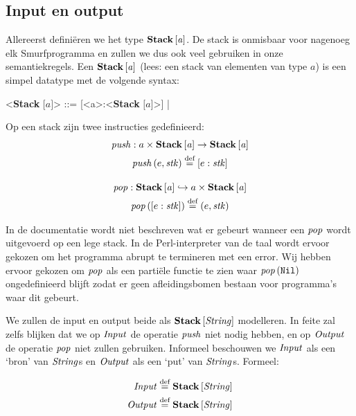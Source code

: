\subsection{Input en output}
\label{sec:def:io}

Allereerst definiëren we het type $\mathbf{Stack}\left[\mathit{a}\right]$. De stack is onmisbaar voor
nagenoeg elk Smurfprogramma en zullen we dus ook veel gebruiken in onze
semantiekregels. Een $\mathbf{Stack}\left[\mathit{a}\right]$ (lees: een stack van elementen van type $a$)
is een simpel datatype met de volgende syntax:

\def\inbrackets#1{$\mathrm{[}#1\mathrm{]}$}
\def\bracka{\inbrackets{a}}
\def\StackA{{\normalfont\textbf{Stack}} \bracka}
\begin{grammar}
	<\StackA> ::= [<a>:<\StackA>] | \Nil
\end{grammar}

Op een stack zijn twee instructies gedefinieerd:
\begin{gather*}
	\mathit{push} : a \times \mathbf{Stack}\left[\mathit{a}\right] \to \mathbf{Stack}\left[\mathit{a}\right] \\
	\mathit{push}\left(e, \mathit{stk}\right) \stackrel{\text{def}}{=} [e:\mathit{stk}] \\[1em]
	\mathit{pop} : \mathbf{Stack}\left[\mathit{a}\right] \hookrightarrow a \times \mathbf{Stack}\left[\mathit{a}\right] \\
	\mathit{pop}\left([e:\mathit{stk}]\right) \stackrel{\text{def}}{=} (e,\mathit{stk}) \\
\end{gather*}

In de documentatie \cite{safalra} wordt niet beschreven wat er gebeurt wanneer
een $\mathit{pop}$ wordt uitgevoerd op een lege stack. In de Perl-interpreter van de
taal wordt ervoor gekozen om het programma abrupt te termineren met een error.
Wij hebben ervoor gekozen om $\mathit{pop}$ als een partiële functie te zien waar
$\mathit{pop}\left(\texttt{Nil}\right)$ ongedefinieerd blijft zodat er geen afleidingsbomen bestaan voor
programma's waar dit gebeurt.

\medskip
We zullen de input en output beide als $\mathbf{Stack}\left[\mathit{\mathit{String}}\right]$ modelleren. In feite
zal zelfs blijken dat we op $\mathit{Input}$ de operatie $\mathit{push}$ niet nodig hebben,
en op $\mathit{Output}$ de operatie $\mathit{pop}$ niet zullen gebruiken. Informeel
beschouwen we $\mathit{Input}$ als een `bron' van $\mathit{String}$s en $\mathit{Output}$ als een `put'
van $\mathit{String}$s. Formeel:

\begin{align*}
	\mathit{Input} &\stackrel{\text{def}}{=} \mathbf{Stack}\left[\mathit{\mathit{String}}\right] \\ \mathit{Output} &\stackrel{\text{def}}{=} \mathbf{Stack}\left[\mathit{\mathit{String}}\right]
\end{align*}

